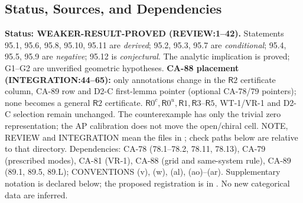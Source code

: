 \subsection{Status, Sources, and Dependencies}
\textbf{Status: WEAKER-RESULT-PROVED (REVIEW:1--42).} Statements 95.1, 95.6, 95.8, 95.10, 95.11 are
\emph{derived}; 95.2, 95.3, 95.7 are \emph{conditional}; 95.4, 95.5, 95.9 are \emph{negative}; 95.12 is
\emph{conjectural}. The analytic implication is proved; G1--G2 are unverified geometric hypotheses.
\textbf{CA-88 placement (INTEGRATION:44--65):} only annotations change in the \(\mathsf R2\) certificate column,
CA-89 row and D2-C first-lemma pointer (optional CA-78/79 pointers); none becomes a general \(\mathsf R2\) certificate.
\(\mathsf R0^c,\mathsf R0^u,\mathsf R1,\mathsf R3\)--\(\mathsf R5\), WT-1/VR-1 and D2-C selection remain unchanged.
The counterexample has only the trivial zero representation; the AP calibration does not move the open/chiral cell.
NOTE, REVIEW and INTEGRATION mean the files in
; check paths below are relative to that directory.
Dependencies: CA-78 (78.1--78.2, 78.11, 78.13), CA-79 (prescribed modes), CA-81 (VR-1), CA-88 (grid and same-system
rule), CA-89 (89.1, 89.5, 89.L); CONVENTIONS (v), (w), (al), (ao)--(ar). Supplementary notation is declared below;
the proposed registration is in . No new categorical data are inferred.

